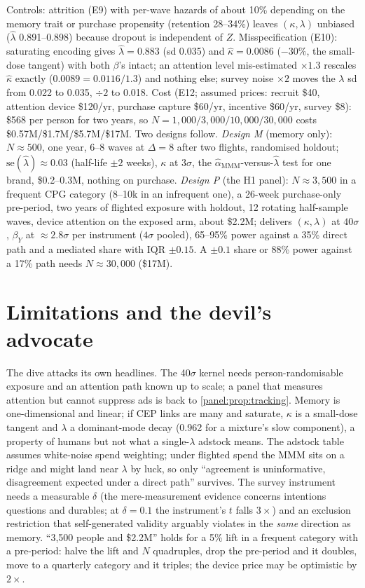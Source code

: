 Controls: attrition (E9) with per-wave hazards of about 10\% depending on the memory trait or purchase propensity (retention 28--34\%) leaves $(\kappa, \lambda)$ unbiased ($\hat\lambda$ 0.891--0.898) because dropout is independent of $Z$. Misspecification (E10): saturating encoding gives $\hat\lambda = 0.883$ (sd 0.035) and $\hat\kappa = 0.0086$ ($-30\%$, the small-dose tangent) with both $\beta$'s intact; an attention level mis-estimated $\times 1.3$ rescales $\hat\kappa$ exactly ($0.0089 = 0.0116/1.3$) and nothing else; survey noise $\times 2$ moves the $\lambda$ sd from 0.022 to 0.035, $\div 2$ to 0.018. Cost (E12; assumed prices: recruit \$40, attention device \$120/yr, purchase capture \$60/yr, incentive \$60/yr, survey \$8): \$568 per person for two years, so $N = 1{,}000/3{,}000/10{,}000/30{,}000$ costs \$0.57M/\$1.7M/\$5.7M/\$17M. Two designs follow. \emph{Design M} (memory only): $N \approx 500$, one year, 6--8 waves at $\Delta = 8$ after two flights, randomised holdout; $\mathrm{se}(\hat\lambda) \approx 0.03$ (half-life $\pm 2$ weeks), $\kappa$ at $3\sigma$, the $\hat\alpha_{\mathrm{MMM}}$-versus-$\hat\lambda$ test for one brand, \$0.2--0.3M, nothing on purchase. \emph{Design P} (the H1 panel): $N \approx 3{,}500$ in a frequent CPG category (8--10k in an infrequent one), a 26-week purchase-only pre-period, two years of flighted exposure with holdout, 12 rotating half-sample waves, device attention on the exposed arm, about \$2.2M; delivers $(\kappa, \lambda)$ at $40\sigma$, $\beta_Y$ at $\approx 2.8\sigma$ per instrument ($4\sigma$ pooled), 65--95\% power against a 35\% direct path and a mediated share with IQR $\pm 0.15$. A $\pm 0.1$ share or 88\% power against a 17\% path needs $N \approx 30{,}000$ (\$17M).

\section{Limitations and the devil's advocate}

The dive attacks its own headlines. The 40$\sigma$ kernel needs person-randomisable exposure and an attention path known up to scale; a panel that measures attention but cannot suppress ads is back to \cref{panel:prop:tracking}. Memory is one-dimensional and linear; if CEP links are many and saturate, $\kappa$ is a small-dose tangent and $\lambda$ a dominant-mode decay (0.962 for a mixture's slow component), a property of humans but not what a single-$\lambda$ adstock means. The adstock table assumes white-noise spend weighting; under flighted spend the MMM sits on a ridge and might land near $\lambda$ by luck, so only ``agreement is uninformative, disagreement expected under a direct path'' survives. The survey instrument needs a measurable $\delta$ (the mere-measurement evidence concerns intentions questions and durables; at $\delta = 0.1$ the instrument's $t$ falls $3\times$) and an exclusion restriction that self-generated validity arguably violates in the \emph{same} direction as memory. ``3,500 people and \$2.2M'' holds for a 5\% lift in a frequent category with a pre-period: halve the lift and $N$ quadruples, drop the pre-period and it doubles, move to a quarterly category and it triples; the device price may be optimistic by $2\times$.

